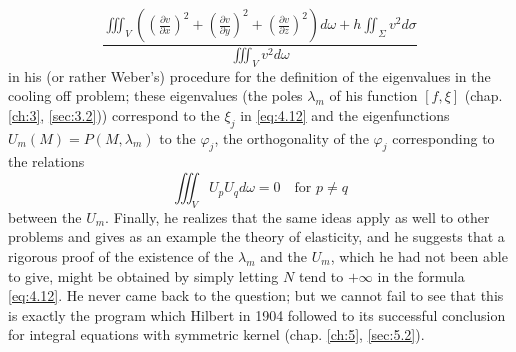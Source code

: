 \documentclass[12pt,a4paper,leqno,twoside]{extbook}
\newcommand{\pder}[2]{\frac{\partial #1}{\partial #2}}
\newcommand{\divergence}[1]{\left(\pder{#1}{x}\right)^2 + \left(\pder{#1}{y}\right)^2 + \left(\pder{#1}{z}\right)^2}
\newcommand{\Iint}{\displaystyle\iint}
\newcommand{\Iiint}{\displaystyle\iiint}
\begin{document}
\[
    \frac{\Iiint_V \left(\divergence{v}\right)d\omega + h\Iint_\Sigma v^2 d\sigma}{\Iiint_V v^2 d\omega}
\]
in his (or rather Weber's) procedure for the definition of the eigenvalues in the cooling off problem; these eigenvalues (the poles \(\lambda_m\) of his function \([f, \xi]\) (chap. \ref{ch:3}, \ref{sec:3.2})) correspond to the \(\xi_j\) in \eqref{eq:4.12} and the eigenfunctions \(U_m(M) = P(M,\lambda_m)\) to the \(\varphi_j\), the orthogonality of the \(\varphi_j\) corresponding to the relations
\[
    \Iiint_V U_p U_q d\omega = 0 \quad \text{for } p \neq q
\]
between the \(U_m\). Finally, he realizes that the same ideas apply as well to other problems and gives as an example the theory of elasticity, and he suggests that a rigorous proof of the existence of the \(\lambda_m\) and the \(U_m\), which he had not been able to give, might be obtained by simply letting \(N\) tend to \(+\infty\) in the formula \eqref{eq:4.12}. He never came back to the question; but we cannot fail to see that this is exactly the program which Hilbert in 1904 followed to its successful conclusion for integral equations with symmetric kernel (chap. \ref{ch:5}, \ref{sec:5.2}).
\end{document}
